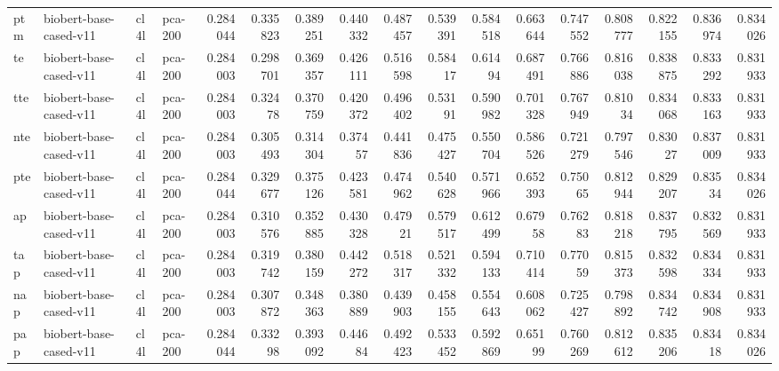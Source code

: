 \begin{tabular}{llllrrrrrrrrrrrrr}
 ptm         & biobert-base-cased-v11 & cl4l             & pca-200               &     0.284044 &     0.335823 &     0.389251 &     0.440332 &     0.487457 &     0.539391 &     0.584518 &     0.663644 &     0.747552 &     0.808777 &      0.822155 &      0.836974 &      0.834026 \\
 te          & biobert-base-cased-v11 & cl4l             & pca-200               &     0.284003 &     0.298701 &     0.369357 &     0.426111 &     0.516598 &     0.58417  &     0.61494  &     0.687491 &     0.766886 &     0.816038 &      0.838875 &      0.833292 &      0.831933 \\
 tte         & biobert-base-cased-v11 & cl4l             & pca-200               &     0.284003 &     0.32478  &     0.370759 &     0.420372 &     0.496402 &     0.53191  &     0.590982 &     0.701328 &     0.767949 &     0.81034  &      0.834068 &      0.833163 &      0.831933 \\
 nte         & biobert-base-cased-v11 & cl4l             & pca-200               &     0.284003 &     0.305493 &     0.314304 &     0.37457  &     0.441836 &     0.475427 &     0.550704 &     0.586526 &     0.721279 &     0.797546 &      0.83027  &      0.837009 &      0.831933 \\
 pte         & biobert-base-cased-v11 & cl4l             & pca-200               &     0.284044 &     0.329677 &     0.375126 &     0.423581 &     0.474962 &     0.540628 &     0.571966 &     0.652393 &     0.75065  &     0.812944 &      0.829207 &      0.83534  &      0.834026 \\
 ap          & biobert-base-cased-v11 & cl4l             & pca-200               &     0.284003 &     0.310576 &     0.352885 &     0.430328 &     0.47921  &     0.579517 &     0.612499 &     0.67958  &     0.76283  &     0.818218 &      0.837795 &      0.832569 &      0.831933 \\
 tap         & biobert-base-cased-v11 & cl4l             & pca-200               &     0.284003 &     0.319742 &     0.380159 &     0.442272 &     0.518317 &     0.521332 &     0.594133 &     0.710414 &     0.77059  &     0.815373 &      0.832598 &      0.834334 &      0.831933 \\
 nap         & biobert-base-cased-v11 & cl4l             & pca-200               &     0.284003 &     0.307872 &     0.348363 &     0.380889 &     0.439903 &     0.458155 &     0.554643 &     0.608062 &     0.725427 &     0.798892 &      0.834742 &      0.834908 &      0.831933 \\
 pap         & biobert-base-cased-v11 & cl4l             & pca-200               &     0.284044 &     0.33298  &     0.393092 &     0.44684  &     0.492423 &     0.533452 &     0.592869 &     0.65199  &     0.760269 &     0.812612 &      0.835206 &      0.83418  &      0.834026 \\

\end{tabular}
